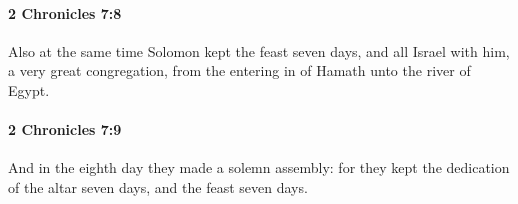 		\paragraph{2 Chronicles 7:8} %
			\label{2CHRONICLES-7-8}

			Also at the same time Solomon kept the feast seven days, and all Israel with him, a very great congregation, from the entering in of Hamath unto the river of Egypt.


		\paragraph{2 Chronicles 7:9} %
			\label{2CHRONICLES-7-9}

			And in the eighth day they made a solemn assembly: for they kept the dedication of the altar seven days, and the feast seven days.


